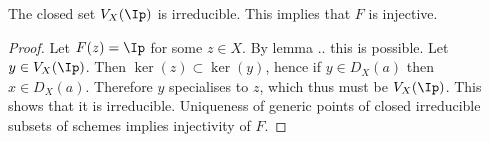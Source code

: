 \begin{lemma}
The closed set $V_X(\Ip)$ is irreducible. This implies that $F$ is injective.
\end{lemma}
\begin{proof}
Let $F(z)=\Ip$ for some $z\in X$. By lemma .. this is possible.
Let $y\in V_X(\Ip)$. Then $\ker(z)\subset \ker(y)$, hence if $y\in D_X(a)$ then $x\in D_X(a)$. 
Therefore $y$ specialises to $z$, which thus must be $V_X(\Ip)$. This shows that it is irreducible.
Uniqueness of generic points of closed irreducible subsets of schemes implies injectivity of $F$.
\begin{comment}
Let $U \cup V = V_X(\Ip)$ with $U,V$ closed. 
The inclusions $u,v$ of closed sets $U,V$ is a quasi-compact map, because a closed set of a quasi-compact is quasi-compact. 
Therefore $u_*,v_*$ sends quasi-coherent modules to quasi-coherent modules [Reference].

Let $\sheaf{I},\sheaf{J}$ be the ideal sheaves corresponding to the reduced induced subscheme structure $(U,\sheaf{O}_U),(V,\sheaf{O}_V)$
on the closed sets $U$ and $V$. Hence the sequences
\[\sheaf{I}\rightarrow \sheaf{O}_X \rightarrow u_*(\sheaf{O}_U)\rightarrow 0,\]
\[\sheaf{J}\rightarrow \sheaf{O}_X \rightarrow v_*(\sheaf{O}_V)\rightarrow 0\]
are exact and so $\sheaf{I},\sheaf{J}$ are quasi-coherent.
Let $I,J$ be the global sections of $\sheaf{I}$ and $\sheaf{J}$.
Because of our adjoint equivalence $\Lambda_X(I)=\sheaf{I}$ and $\Lambda_X(J)=\sheaf{J}$, hence also $U=V_X(I)$ and $V=V_X(J)$.
We now have $V_X(IJ)=V_X(\Ip)$.
Moreover $\Lambda_X(\frac{\sheaf{O}(X)}{I}) \iso \frac{\sheaf{O}}{\sheaf{I}} \iso u_*(\sheaf{O}_U)$ and similar for $J,v,V$.
Since $\sheaf{O}_U$ is a reduced sheaf, $\sheaf{I}(W)$ is radical for every open $W \subset X$.

Now invoke the previous lemma for both inclusions wrt $IJ$ and $\Ip$. 
This yields $I\cap J = \Ip$, hence $I=\Ip$ or $J=\Ip$.
Now one of the closed sets $U,V$ is the whole of $V_X(\Ip)$.
\end{comment}
\end{proof}

